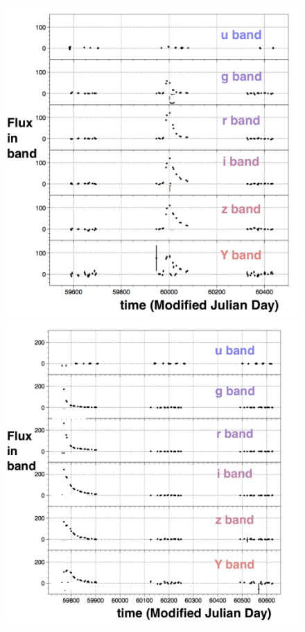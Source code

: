 \begin{figure}[htbp!]
\begin{center} 
\includegraphics[scale=0.4]{figures/lcplot_model01a.png}
\includegraphics[scale=0.4]{figures/lcplot_model01b.png}

\end{center}
\end{figure}
